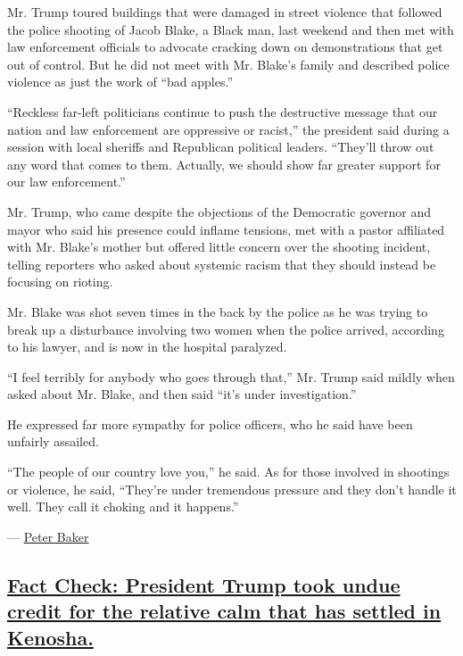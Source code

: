 Mr. Trump toured buildings that were damaged in street violence that
followed the police shooting of Jacob Blake, a Black man, last weekend
and then met with law enforcement officials to advocate cracking down on
demonstrations that get out of control. But he did not meet with Mr.
Blake's family and described police violence as just the work of ``bad
apples.''

``Reckless far-left politicians continue to push the destructive message
that our nation and law enforcement are oppressive or racist,'' the
president said during a session with local sheriffs and Republican
political leaders. ``They'll throw out any word that comes to them.
Actually, we should show far greater support for our law enforcement.''

Mr. Trump, who came despite the objections of the Democratic governor
and mayor who said his presence could inflame tensions, met with a
pastor affiliated with Mr. Blake's mother but offered little concern
over the shooting incident, telling reporters who asked about systemic
racism that they should instead be focusing on rioting.

Mr. Blake was shot seven times in the back by the police as he was
trying to break up a disturbance involving two women when the police
arrived, according to his lawyer, and is now in the hospital paralyzed.

``I feel terribly for anybody who goes through that,'' Mr. Trump said
mildly when asked about Mr. Blake, and then said ``it's under
investigation.''

He expressed far more sympathy for police officers, who he said have
been unfairly assailed.

``The people of our country love you,'' he said. As for those involved
in shootings or violence, he said, ``They're under tremendous pressure
and they don't handle it well. They call it choking and it happens.''

--- \href{https://www.nytimes3xbfgragh.onion/by/peter-baker}{Peter
Baker}

\hypertarget{fact-check-president-trump-took-undue-credit-for-the-relative-calm-that-has-settled-in-kenosha}{%
\subsection{\texorpdfstring{\protect\hyperlink{fact-check-president-trump-took-undue-credit-for-the-relative-calm-that-has-settled-in-kenosha}{Fact
Check: President Trump took undue credit for the relative calm that has
settled in
Kenosha.}}{Fact Check: President Trump took undue credit for the relative calm that has settled in Kenosha.}}\label{fact-check-president-trump-took-undue-credit-for-the-relative-calm-that-has-settled-in-kenosha}}

